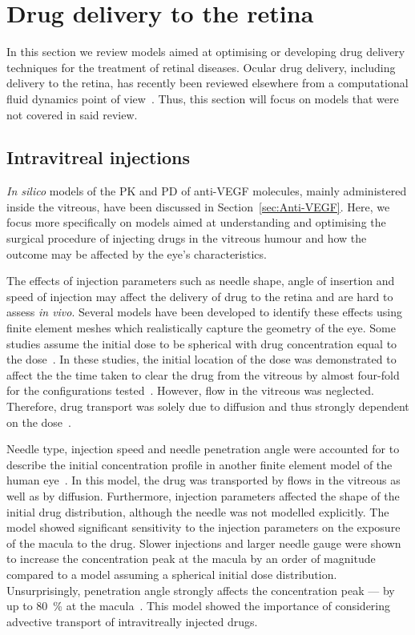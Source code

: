\documentclass{article}
\begin{document}
\section{Drug delivery to the retina}\label{sec:DrugDelivery}

In this section we review models aimed at optimising or developing drug delivery techniques for the treatment of retinal diseases.
Ocular drug delivery, including delivery to the retina, has recently been reviewed elsewhere from a computational fluid dynamics point of view~\cite{Bhandari_2021}.
Thus, this section will focus on models that were not covered in said review.

\subsection{Intravitreal injections}

\textit{In silico} models of the PK and PD of anti-VEGF molecules, mainly administered inside the vitreous, have been discussed in Section~\ref{sec:Anti-VEGF}.
Here, we focus more specifically on models aimed at understanding and optimising the surgical procedure of injecting drugs in the vitreous humour and how the outcome may be affected by the eye's characteristics.

The effects of injection parameters such as needle shape, angle of insertion and speed of injection may affect the delivery of drug to the retina and are hard to assess \textit{in vivo}.
Several models have been developed to identify these effects using finite element meshes which realistically capture the geometry of the eye.
Some studies assume the initial dose to be spherical with drug concentration equal to the dose~\cite{Friedrich_1997,Friedrich_1997a}.
In these studies, the initial location of the dose was demonstrated to affect the the time taken to clear the drug from the vitreous by almost four-fold for the configurations tested~\cite{Friedrich_1997}.
However, flow in the vitreous was neglected.
Therefore, drug transport was solely due to diffusion and thus strongly dependent on the dose~\cite{Friedrich_1997}.

Needle type, injection speed and needle penetration angle were accounted for to describe the initial concentration profile in another finite element model of the human eye~\cite{Jooybar_2014}.
In this model, the drug was transported by flows in the vitreous as well as by diffusion.
Furthermore, injection parameters affected the shape of the initial drug distribution, although the needle was not modelled explicitly.
The model showed significant sensitivity to the injection parameters on the exposure of the macula to the drug.
Slower injections and larger needle gauge were shown to increase the concentration peak at the macula by an order of magnitude compared to a model assuming a spherical initial dose distribution.
Unsurprisingly, penetration angle strongly affects the concentration peak --- by up to \SI{80}{\percent} at the macula~\cite{Jooybar_2014}.
This model showed the importance of considering advective transport of intravitreally injected drugs. 
\end{document}
